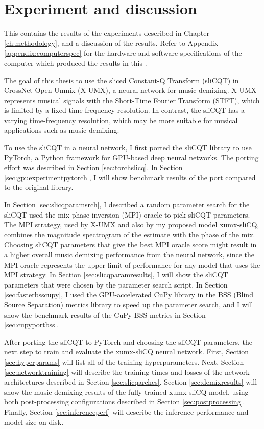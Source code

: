 \documentclass[report.tex]{subfiles}
\begin{document}
\section{Experiment and discussion}
\label{ch:experiment}

This  contains the results of the experiments described in Chapter \ref{ch:methodology}, and a discussion of the results. Refer to Appendix \ref{appendix:computerspec} for the hardware and software specifications of the computer which produced the results in this .

The goal of this thesis  to use the sliced Constant-Q Transform (sliCQT) in CrossNet-Open-Unmix (X-UMX), a neural network for music demixing. X-UMX represents musical signals with the Short-Time Fourier Transform (STFT), which is limited by a fixed time-frequency resolution. In contrast, the sliCQT has a varying time-frequency resolution, which may be more suitable for musical applications such as music demixing.

To use the sliCQT in a neural network, I first ported the sliCQT library to use PyTorch, a Python framework for GPU-based deep neural networks. The porting effort was described in Section \ref{sec:torchslicq}. In Section \ref{sec:gpuexperimentpytorch}, I will show benchmark results of the port compared to the original library.

In Section \ref{sec:slicqparamsrch}, I described a random parameter search for the sliCQT  used the mix-phase inversion (MPI) oracle to pick sliCQT parameters. The MPI strategy, used by X-UMX and also by my proposed model xumx-sliCQ, combines the magnitude spectrogram of the estimate with the phase of the mix. Choosing sliCQT parameters that give the best MPI oracle score might result in a higher overall music demixing performance from the neural network, since the MPI oracle represents the upper limit of performance for any model that uses the MPI strategy. In Section \ref{sec:slicqparamresults}, I will show the sliCQT parameters that were chosen by the parameter search script. In Section \ref{sec:fasterbsscupy}, I used the GPU-accelerated CuPy library in the BSS (Blind Source Separation) metrics library to speed up the parameter search, and I will show the benchmark results of the CuPy BSS metrics in Section \ref{sec:cupyportbss}.

After porting the sliCQT to PyTorch and choosing the sliCQT parameters, the next step  to train and evaluate the xumx-sliCQ neural network. First, Section \ref{sec:hyperparams} will list all of the training hyperparameters. Next, Section \ref{sec:networktraining} will describe the training times and losses of the network architectures described in Section \ref{sec:slicqarches}. Section \ref{sec:demixresults} will show the music demixing results of the fully trained xumx-sliCQ model, using both post-processing configurations described in Section \ref{sec:postprocessing}. Finally, Section \ref{sec:inferenceperf} will describe the inference performance and model size on disk.
\end{document}
